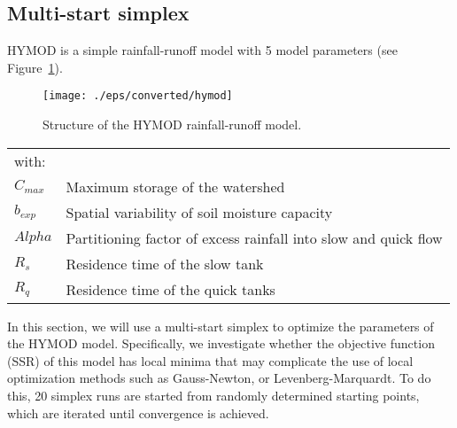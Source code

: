 






\subsection{Multi-start simplex}

HYMOD \citep{boyl-gupt-soro2000} is a simple rainfall-runoff model with 5 model
parameters (see Figure~\ref{fig:hymod}).

\begin{figure}[htbp]
  \centering
    \texttt{[image: ./eps/converted/hymod]}
  \caption{Structure of the HYMOD rainfall-runoff model.}
  \label{fig:hymod}
\end{figure}
\begin{tabular}{ll}
with:&\\
$C_{max}$&Maximum storage of the watershed\\
$b_{exp}$&Spatial variability of soil moisture capacity\\
$Alpha$&Partitioning factor of excess rainfall into slow and quick flow\\
$R_{s}$&Residence time of the slow tank\\
$R_{q}$&Residence time of the quick tanks\\
\end{tabular}

In this section, we will use a multi-start simplex \citep{neld-mead1965} to
optimize the parameters of the HYMOD model. Specifically, we investigate whether
the objective function (SSR) of this model has local minima that may complicate
the use of local optimization methods such as Gauss-Newton, or
Levenberg-Marquardt. To do this, 20 simplex runs are started from randomly
determined starting points, which are iterated until convergence is achieved.

